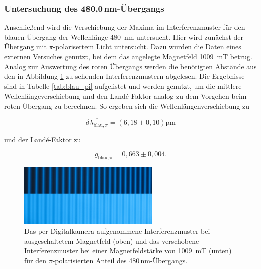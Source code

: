         \subsubsection*{Untersuchung des 480,0\,nm-Übergangs}
            Anschließend wird die Verschiebung der Maxima im Interferenzmuster für den blauen Übergang der Wellenlänge \SI{480}{\nano\metre} untersucht. Hier wird zunächst der Übergang mit $\pi$-polarisertem
            Licht untersucht. Dazu wurden die Daten eines externen Versuches genutzt, bei dem das angelegte Magnetfeld \SI{1009}{\milli\tesla} betrug.
            Analog zur Auswertung des roten Übergangs 
            werden die benötigten Abstände aus den in Abbildung \ref{fig:blau_pi} zu sehenden Interferenzmustern abgelesen. Die Ergebnisse sind in 
            Tabelle \ref{tab:blau_pi} aufgelistet und werden genutzt, um die mittlere Wellenlängeverschiebung und den Landé-Faktor analog zu dem Vorgehen beim roten Übergang zu berechnen. So ergeben sich die
            Wellenlängenverschiebung zu

            \begin{equation*}
                \overline{\delta \lambda_{\text{blau}, \pi}} = \left(6,18 \pm 0,10\right)\si{\pico\metre}
            \end{equation*}

            und der Landé-Faktor zu

            \begin{equation*}
              g_{\text{blau}, \pi} = 0,663 \pm 0,004 .
            \end{equation*}

            \FloatBarrier

            \begin{figure}[h]
              \centering
              \includegraphics[width = 0.6\textwidth]{pictures/blau_pi.png}
              \caption{Das per Digitalkamera aufgenommene Interferenzmuster bei ausgeschaltetem Magnetfeld (oben) und das verschobene Interferenzmuster bei einer Magnetfeldstärke von \SI{1009}{\milli\tesla} (unten) für den $\pi$-polarisierten Anteil des 480\,nm-Übergangs.}
              \label{fig:blau_pi}
            \end{figure}
        
